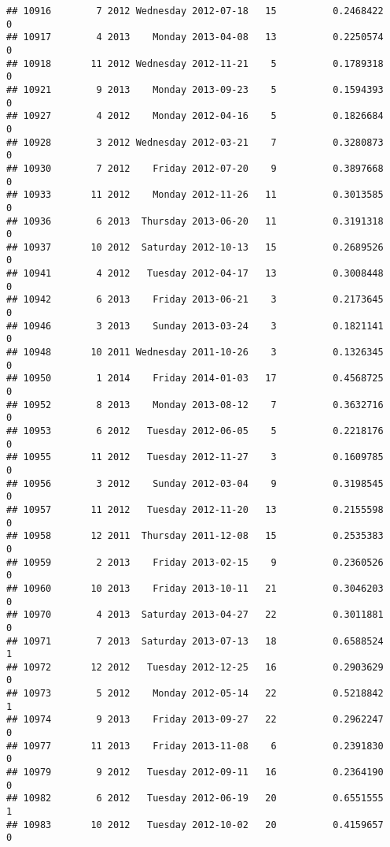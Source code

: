 \documentclass[
]{article}
\begin{document}
\begin{verbatim}
## 10916        7 2012 Wednesday 2012-07-18   15          0.2468422             0
## 10917        4 2013    Monday 2013-04-08   13          0.2250574             0
## 10918       11 2012 Wednesday 2012-11-21    5          0.1789318             0
## 10921        9 2013    Monday 2013-09-23    5          0.1594393             0
## 10927        4 2012    Monday 2012-04-16    5          0.1826684             0
## 10928        3 2012 Wednesday 2012-03-21    7          0.3280873             0
## 10930        7 2012    Friday 2012-07-20    9          0.3897668             0
## 10933       11 2012    Monday 2012-11-26   11          0.3013585             0
## 10936        6 2013  Thursday 2013-06-20   11          0.3191318             0
## 10937       10 2012  Saturday 2012-10-13   15          0.2689526             0
## 10941        4 2012   Tuesday 2012-04-17   13          0.3008448             0
## 10942        6 2013    Friday 2013-06-21    3          0.2173645             0
## 10946        3 2013    Sunday 2013-03-24    3          0.1821141             0
## 10948       10 2011 Wednesday 2011-10-26    3          0.1326345             0
## 10950        1 2014    Friday 2014-01-03   17          0.4568725             0
## 10952        8 2013    Monday 2013-08-12    7          0.3632716             0
## 10953        6 2012   Tuesday 2012-06-05    5          0.2218176             0
## 10955       11 2012   Tuesday 2012-11-27    3          0.1609785             0
## 10956        3 2012    Sunday 2012-03-04    9          0.3198545             0
## 10957       11 2012   Tuesday 2012-11-20   13          0.2155598             0
## 10958       12 2011  Thursday 2011-12-08   15          0.2535383             0
## 10959        2 2013    Friday 2013-02-15    9          0.2360526             0
## 10960       10 2013    Friday 2013-10-11   21          0.3046203             0
## 10970        4 2013  Saturday 2013-04-27   22          0.3011881             0
## 10971        7 2013  Saturday 2013-07-13   18          0.6588524             1
## 10972       12 2012   Tuesday 2012-12-25   16          0.2903629             0
## 10973        5 2012    Monday 2012-05-14   22          0.5218842             1
## 10974        9 2013    Friday 2013-09-27   22          0.2962247             0
## 10977       11 2013    Friday 2013-11-08    6          0.2391830             0
## 10979        9 2012   Tuesday 2012-09-11   16          0.2364190             0
## 10982        6 2012   Tuesday 2012-06-19   20          0.6551555             1
## 10983       10 2012   Tuesday 2012-10-02   20          0.4159657             0

\end{verbatim}
\end{document}
